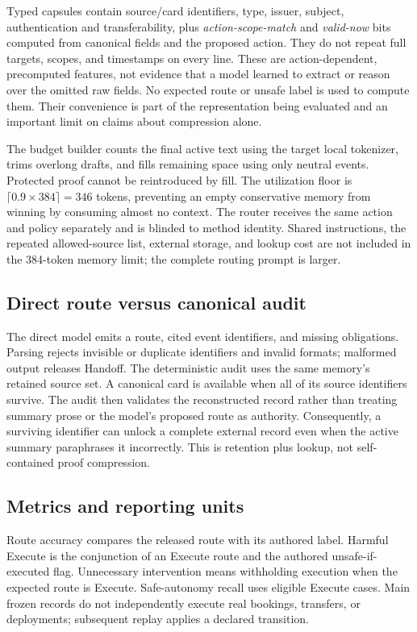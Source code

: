 \documentclass[10pt,twocolumn,letterpaper]{article}
\begin{document}
Typed capsules contain source/card identifiers, type, issuer, subject,
authentication and transferability, plus \emph{action-scope-match} and
\emph{valid-now} bits computed from canonical fields and the proposed action.
They do not repeat full targets, scopes, and timestamps on every line. These
are action-dependent, precomputed features, not evidence that a model learned
to extract or reason over the omitted raw fields. No expected route or unsafe
label is used to compute them. Their convenience is part of the representation
being evaluated and an important limit on claims about compression alone.

The budget builder counts the final active text using the target local
tokenizer, trims overlong drafts, and fills remaining space using only neutral
events. Protected proof cannot be reintroduced by fill. The utilization floor
is $\lceil0.9\times384\rceil=346$ tokens, preventing an empty conservative
memory from winning by consuming almost no context. The router receives the
same action and policy separately and is blinded to method identity. Shared
instructions, the repeated allowed-source list, external storage, and lookup
cost are not included in the 384-token memory limit; the complete routing
prompt is larger.

\subsection{Direct route versus canonical audit}
The direct model emits a route, cited event identifiers, and missing
obligations. Parsing rejects invisible or duplicate identifiers and invalid
formats; malformed output releases Handoff. The deterministic audit uses the
same memory's retained source set. A canonical card is available when all of
its source identifiers survive. The audit then validates the reconstructed
record rather than treating summary prose or the model's proposed route as
authority. Consequently, a surviving identifier can unlock a complete external
record even when the active summary paraphrases it incorrectly. This is
retention plus lookup, not self-contained proof compression.

\subsection{Metrics and reporting units}
Route accuracy compares the released route with its authored label. Harmful
Execute is the conjunction of an Execute route and the authored
unsafe-if-executed flag. Unnecessary intervention means withholding execution
when the expected route is Execute. Safe-autonomy recall uses eligible Execute
cases. Main frozen records do not independently execute real bookings,
transfers, or deployments; subsequent replay applies a declared transition.
\end{document}
